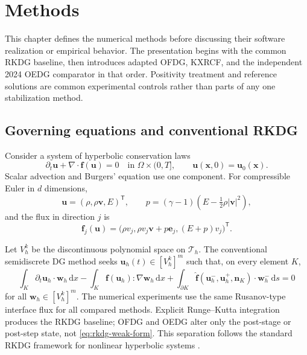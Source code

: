 \chapter{Methods}
\label{chap:methods}

This chapter defines the numerical methods before discussing their software
realization or empirical behavior.  The presentation begins with the common
RKDG baseline, then introduces adapted OFDG, KXRCF, and the independent 2024
OEDG comparator in that order.  Positivity treatment and reference solutions
are common experimental controls rather than parts of any one stabilization
method.

\section{Governing equations and conventional RKDG}
\label{sec:rkdg}

Consider a system of hyperbolic conservation laws
\begin{equation}
  \partial_t\boldsymbol u+\nabla\cdot\boldsymbol f(\boldsymbol u)=0
  \quad\text{in }\Omega\times(0,T],
  \qquad
  \boldsymbol u(\boldsymbol x,0)=\boldsymbol u_0(\boldsymbol x).
  \label{eq:conservation-law}
\end{equation}
Scalar advection and Burgers' equation use one component.  For compressible
Euler in $d$ dimensions,
\begin{equation}
 \boldsymbol u=(\rho,\rho\boldsymbol v,E)^\mathsf T,
 \qquad
 p=(\gamma-1)\left(E-\tfrac12\rho|\boldsymbol v|^2\right),
 \label{eq:euler-state}
\end{equation}
and the flux in direction $j$ is
\begin{equation}
 \boldsymbol f_j(\boldsymbol u)
 =\bigl(\rho v_j,
        \rho v_j\boldsymbol v+p\boldsymbol e_j,
        (E+p)v_j\bigr)^\mathsf T.
 \label{eq:euler-flux}
\end{equation}

Let $V_h^k$ be the discontinuous polynomial space on
$\mathcal T_h$.  The conventional semidiscrete DG method seeks
$\boldsymbol u_h(t)\in[V_h^k]^m$ such that, on every element $K$,
\begin{equation}
 \int_K\partial_t\boldsymbol u_h\cdot\boldsymbol w_h\,\mathrm dx
 -\int_K\boldsymbol f(\boldsymbol u_h):\nabla\boldsymbol w_h\,\mathrm dx
 +\int_{\partial K}\widehat{\boldsymbol f}
       (\boldsymbol u_h^-,\boldsymbol u_h^+,\boldsymbol n_K)
       \cdot\boldsymbol w_h^-\,\mathrm ds=0
 \label{eq:rkdg-weak-form}
\end{equation}
for all $\boldsymbol w_h\in[V_h^k]^m$.  The numerical experiments use the
same Rusanov-type interface flux for all compared methods.  Explicit
Runge--Kutta integration produces the RKDG baseline; OFDG and OEDG alter only
the post-stage or post-step state, not \cref{eq:rkdg-weak-form}.  This separation
follows the standard RKDG framework for nonlinear hyperbolic systems
\cite{CockburnShu1998,GottliebShu1998}.








